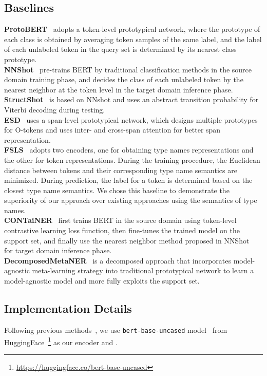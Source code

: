 \documentclass[11pt]{article}
\newcommand{\nonetoken}{\textsc{O}\xspace}
\begin{document}
\subsection{Baselines}\label{appendix_baselines}
{\textbf{ProtoBERT}~\cite{fritzler-2019}} adopts a token-level prototypical network, where the prototype of each class is obtained by averaging token samples of the same label, and the label of each unlabeled token in the query set is determined by its nearest class prototype.\\
{\textbf{NNShot}~\cite{yang-katiyar-2020-simple}} pre-trains BERT by traditional classification methods in the source domain training phase, and decides the class of each unlabeled token by the nearest neighbor at the token level in the target domain inference phase.\\
{\textbf{StructShot}~\cite{yang-katiyar-2020-simple}} is based on NNshot and uses an abstract transition probability for Viterbi decoding during testing.\\
{\textbf{ESD}~\cite{wang-2022-enhanced}} uses a span-level prototypical network, which designs multiple prototypes for \nonetoken-tokens and uses inter- and cross-span attention for better span representation.\\
{\textbf{FSLS}~\cite{ma2022label}} adopts two encoders, one for obtaining type names representations and the other for token representations.  
During the training procedure, the Euclidean distance between tokens and their corresponding type name semantics are minimized.
During prediction, the label for a token is determined based on the closest type name semantics.
We chose this baseline to demonstrate the superiority of our approach over existing approaches using the semantics of type names.\\
{\textbf{CONTaiNER}~\cite{das-etal-2022-container}} first trains BERT in the source domain using token-level contrastive learning loss function, then fine-tunes the trained model on the support set, and finally use the nearest neighbor method proposed in NNShot~\cite{yang-katiyar-2020-simple} for target domain inference phase.\\
{\textbf{DecomposedMetaNER}~\cite{ma-etal-2022-decomposed}} is a decomposed approach that incorporates model-agnostic meta-learning strategy into traditional prototypical network to learn a model-agnostic model and more fully exploits the support set.\\


\subsection{Implementation Details}\label{appendix_implementation_details}
Following previous methods~\cite{ding2021few,das-etal-2022-container,ma-etal-2022-decomposed}, we use {\texttt{bert-base-uncased}} model~\cite{devlin-etal-2019-bert} from HuggingFace~\cite{wolf-etal-2020-transformers}\footnote{\url{https://huggingface.co/bert-base-uncased}} as our encoder  and .
\end{document}
